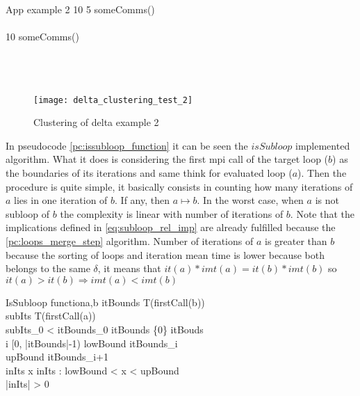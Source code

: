 \begin{multicols}{2}
  \begin{pseudocode}{App example 2}{ }
  \label{pc:delta_classification_example_2}
        10 \DO 
      \BEGIN 
          5 \DO
        \BEGIN 
            someComms() \\
        \END \\
          10 \DO
        \BEGIN 
            someComms()\\
        \END \\
         \\
      \END \\
  \end{pseudocode}
  \columnbreak
  \begin{figure}[H]
    \centering
    \texttt{[image: delta\_clustering\_test\_2]}
    \caption{Clustering of delta example 2}
    \label{fig:delta_classification_2}
  \end{figure}
\end{multicols}

In pseudocode \ref{pc:issubloop_function} it can be seen the $isSubloop$ implemented
algorithm. What it does is considering the first mpi call of the target loop
($b$) as the boundaries of its iterations and same think for evaluated loop
($a$). Then the procedure is quite simple, it basically consists in counting how
many iterations of $a$ lies in one iteration of $b$. If any, then $a
\mapsto b$. In the worst case, when $a$ is not subloop of $b$ the
complexity is linear with number of iterations of $b$. Note that the
implications defined in \ref{eq:subloop_rel_imp} are already fulfilled because
the \ref{pc:loops_merge_step} algorithm. Number of iterations of $a$ is greater
than $b$
because the sorting of loops and iteration mean time is lower because both
belongs to the same $\delta$, it means that $it(a)*imt(a) = it(b)*imt(b)$ so $it(a)
> it(b) \Rightarrow imt(a) < imt(b)$

\begin{pseudocode}{IsSubloop function}{a,b}
\label{pc:issubloop_function}
    itBounds \GETS T(firstCall(b)) \\
    subIts \GETS T(firstCall(a)) \\

    \IF subIts_{0} < itBounds_{0} \THEN
        itBounds \GETS \{0\} \cup itBouds \\

    \FOR i \in [0, |itBounds|-1) \DO
    \BEGIN
        lowBound \GETS itBounds_{i} \\
        upBound \GETS itBounds_{i+1} \\

        inIts \GETS \forall x \in inIts : lowBound < x < upBound \\
        \IF |inIts| > 0 \THEN
    \END \\
\end{pseudocode}

